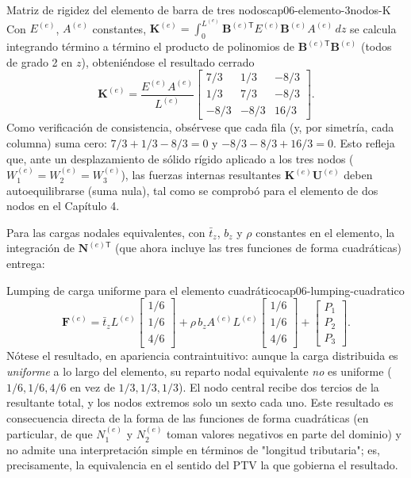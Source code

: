 \begin{ecnimportante}{Matriz de rigidez del elemento de barra de tres nodos}{cap06-elemento-3nodos-K}
Con $E^{(e)}$, $A^{(e)}$ constantes, $\bm K^{(e)}=\displaystyle\int_0^{L^{(e)}} \bm B^{(e)\mathsf T}E^{(e)}\bm B^{(e)}A^{(e)}\,dz$ se calcula integrando término a término el producto de polinomios de $\bm B^{(e)\mathsf T}\bm B^{(e)}$ (todos de grado 2 en $z$), obteniéndose el resultado cerrado
\[
\bm K^{(e)} = \frac{E^{(e)}A^{(e)}}{L^{(e)}} \begin{bmatrix} 7/3 & 1/3 & -8/3 \\ 1/3 & 7/3 & -8/3 \\ -8/3 & -8/3 & 16/3 \end{bmatrix} .
\]
Como verificación de consistencia, obsérvese que cada fila (y, por simetría, cada columna) suma cero: $7/3+1/3-8/3=0$ y $-8/3-8/3+16/3=0$. Esto refleja que, ante un desplazamiento de sólido rígido aplicado a los tres nodos ($W_1^{(e)}=W_2^{(e)}=W_3^{(e)}$), las fuerzas internas resultantes $\bm K^{(e)}\bm U^{(e)}$ deben autoequilibrarse (suma nula), tal como se comprobó para el elemento de dos nodos en el Capítulo 4.
\end{ecnimportante}

Para las cargas nodales equivalentes, con $\bar t_z$, $b_z$ y $\rho$ constantes en el elemento, la integración de $\bm N^{(e)\mathsf T}$ (que ahora incluye las tres funciones de forma cuadráticas) entrega:

\begin{ecnimportante}{Lumping de carga uniforme para el elemento cuadrático}{cap06-lumping-cuadratico}
\[
\bm F^{(e)} = \bar t_z L^{(e)} \begin{bmatrix} 1/6 \\ 1/6 \\ 4/6 \end{bmatrix} + \rho\, b_z A^{(e)} L^{(e)} \begin{bmatrix} 1/6 \\ 1/6 \\ 4/6 \end{bmatrix} + \begin{bmatrix} P_1 \\ P_2 \\ P_3 \end{bmatrix} .
\]
Nótese el resultado, en apariencia contraintuitivo: aunque la carga distribuida es \emph{uniforme} a lo largo del elemento, su reparto nodal equivalente \emph{no} es uniforme ($1/6, 1/6, 4/6$ en vez de $1/3,1/3,1/3$). El nodo central recibe dos tercios de la resultante total, y los nodos extremos solo un sexto cada uno. Este resultado es consecuencia directa de la forma de las funciones de forma cuadráticas (en particular, de que $N_1^{(e)}$ y $N_2^{(e)}$ toman valores negativos en parte del dominio) y no admite una interpretación simple en términos de "longitud tributaria"; es, precisamente, la equivalencia en el sentido del PTV la que gobierna el resultado.
\end{ecnimportante}

